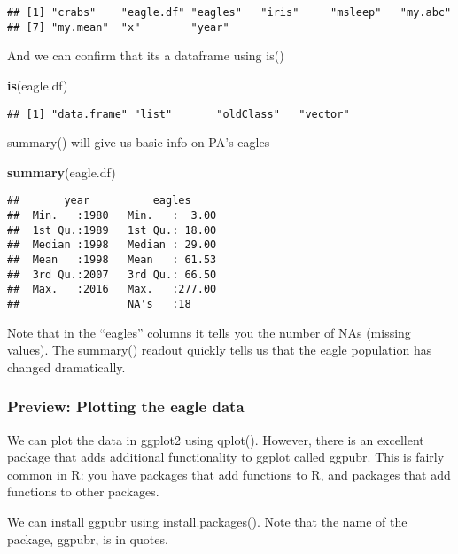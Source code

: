 \documentclass[]{book}
\newenvironment{Shaded}{\begin{snugshade}}{\end{snugshade}}
\newcommand{\KeywordTok}[1]{\textcolor[rgb]{0.13,0.29,0.53}{\textbf{#1}}}
\newcommand{\NormalTok}[1]{#1}
\theoremstyle{definition}
\theoremstyle{definition}
\theoremstyle{definition}
\theoremstyle{remark}
\begin{document}
\begin{verbatim}
## [1] "crabs"    "eagle.df" "eagles"   "iris"     "msleep"   "my.abc"  
## [7] "my.mean"  "x"        "year"
\end{verbatim}

And we can confirm that its a dataframe using is()

\begin{Shaded}
\begin{Highlighting}[]
\KeywordTok{is}\NormalTok{(eagle.df)}
\end{Highlighting}
\end{Shaded}

\begin{verbatim}
## [1] "data.frame" "list"       "oldClass"   "vector"
\end{verbatim}

summary() will give us basic info on PA's eagles

\begin{Shaded}
\begin{Highlighting}[]
\KeywordTok{summary}\NormalTok{(eagle.df)}
\end{Highlighting}
\end{Shaded}

\begin{verbatim}
##       year          eagles      
##  Min.   :1980   Min.   :  3.00  
##  1st Qu.:1989   1st Qu.: 18.00  
##  Median :1998   Median : 29.00  
##  Mean   :1998   Mean   : 61.53  
##  3rd Qu.:2007   3rd Qu.: 66.50  
##  Max.   :2016   Max.   :277.00  
##                 NA's   :18
\end{verbatim}

Note that in the ``eagles'' columns it tells you the number of NAs
(missing values). The summary() readout quickly tells us that the eagle
population has changed dramatically.

\subsubsection{Preview: Plotting the eagle
data}\label{preview-plotting-the-eagle-data}

We can plot the data in ggplot2 using qplot(). However, there is an
excellent package that adds additional functionality to ggplot called
ggpubr. This is fairly common in R: you have packages that add functions
to R, and packages that add functions to other packages.

We can install ggpubr using install.packages(). Note that the name of
the package, ggpubr, is in quotes.
\end{document}
